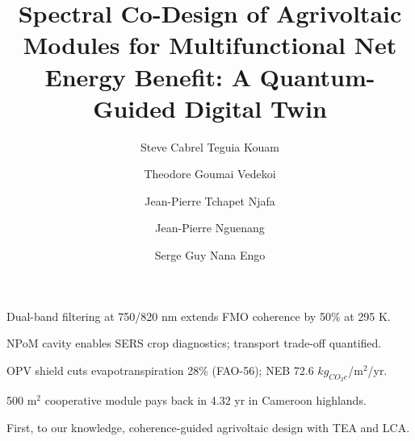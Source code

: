 \documentclass[preprint,12pt]{elsarticle}
\begin{document}

\begin{frontmatter}

\title{Spectral Co-Design of Agrivoltaic Modules for Multifunctional Net Energy Benefit: A Quantum-Guided Digital Twin}

\author[udla]{Steve Cabrel Teguia Kouam}
\author[uy1]{Theodore Goumai Vedekoi}
\author[uy1]{Jean-Pierre Tchapet Njafa}
\author[udla]{Jean-Pierre Nguenang}
\author[uy1]{Serge Guy Nana Engo}


\address[udla]{Department of Physics, Faculty of Science, University of Douala, Cameroon}
\address[uy1]{Department of Physics, Faculty of Science, University of Yaound\'{e} I, Cameroon}


\begin{highlights}
\item Dual-band filtering at 750/820 nm extends FMO coherence by 50\% at 295 K.
\item NPoM cavity enables SERS crop diagnostics; transport trade-off quantified.
\item OPV shield cuts evapotranspiration 28\% (FAO-56); NEB 72.6 $kg_{CO_2e}$/m$^2$/yr.
\item 500 m$^2$ cooperative module pays back in 4.32 yr in Cameroon highlands.
\item First, to our knowledge, coherence-guided agrivoltaic design with TEA and LCA.
\end{highlights}


\end{frontmatter}
\end{document}
